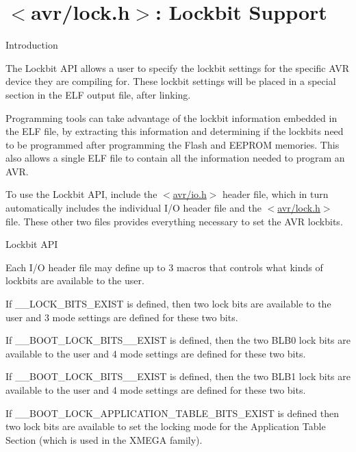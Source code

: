 \hypertarget{group__avr__lock}{}\section{$<$avr/lock.h$>$\+: Lockbit Support}
\label{group__avr__lock}
\begin{DoxyParagraph}{Introduction}

\end{DoxyParagraph}
The Lockbit A\+PI allows a user to specify the lockbit settings for the specific A\+VR device they are compiling for. These lockbit settings will be placed in a special section in the E\+LF output file, after linking.

Programming tools can take advantage of the lockbit information embedded in the E\+LF file, by extracting this information and determining if the lockbits need to be programmed after programming the Flash and E\+E\+P\+R\+OM memories. This also allows a single E\+LF file to contain all the information needed to program an A\+VR.

To use the Lockbit A\+PI, include the $<$\hyperlink{io_8h}{avr/io.\+h}$>$ header file, which in turn automatically includes the individual I/O header file and the $<$\hyperlink{lock_8h}{avr/lock.\+h}$>$ file. These other two files provides everything necessary to set the A\+VR lockbits.

\begin{DoxyParagraph}{Lockbit A\+PI}

\end{DoxyParagraph}
Each I/O header file may define up to 3 macros that controls what kinds of lockbits are available to the user.

If \+\_\+\+\_\+\+L\+O\+C\+K\+\_\+\+B\+I\+T\+S\+\_\+\+E\+X\+I\+ST is defined, then two lock bits are available to the user and 3 mode settings are defined for these two bits.

If \+\_\+\+\_\+\+B\+O\+O\+T\+\_\+\+L\+O\+C\+K\+\_\+\+B\+I\+T\+S\+\_\+\_\+\+E\+X\+I\+ST is defined, then the two B\+L\+B0 lock bits are available to the user and 4 mode settings are defined for these two bits.

If \+\_\+\+\_\+\+B\+O\+O\+T\+\_\+\+L\+O\+C\+K\+\_\+\+B\+I\+T\+S\+\_\+\_\+\+E\+X\+I\+ST is defined, then the two B\+L\+B1 lock bits are available to the user and 4 mode settings are defined for these two bits.

If \+\_\+\+\_\+\+B\+O\+O\+T\+\_\+\+L\+O\+C\+K\+\_\+\+A\+P\+P\+L\+I\+C\+A\+T\+I\+O\+N\+\_\+\+T\+A\+B\+L\+E\+\_\+\+B\+I\+T\+S\+\_\+\+E\+X\+I\+ST is defined then two lock bits are available to set the locking mode for the Application Table Section (which is used in the X\+M\+E\+GA family).

